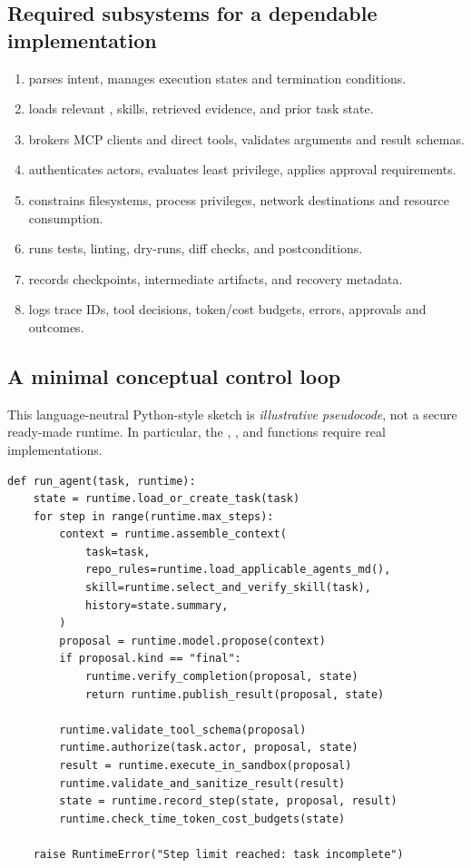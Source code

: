 \documentclass[11pt,letterpaper]{article}
\begin{document}
\subsection{Required subsystems for a dependable implementation}
\begin{enumerate}
\item {} parses intent, manages execution states and termination conditions.
\item {} loads relevant , skills, retrieved evidence, and prior task state.
\item {} brokers MCP clients and direct tools, validates arguments and result schemas.
\item {} authenticates actors, evaluates least privilege, applies approval requirements.
\item {} constrains filesystems, process privileges, network destinations and resource consumption.
\item {} runs tests, linting, dry-runs, diff checks, and postconditions.
\item {} records checkpoints, intermediate artifacts, and recovery metadata.
\item {} logs trace IDs, tool decisions, token/cost budgets, errors, approvals and outcomes.
\end{enumerate}

\subsection{A minimal conceptual control loop}
This language-neutral Python-style sketch is \emph{illustrative pseudocode}, not a secure ready-made runtime. In particular, the , , and  functions require real implementations.
\par\smallskip{}\par
\begin{verbatim}
def run_agent(task, runtime):
    state = runtime.load_or_create_task(task)
    for step in range(runtime.max_steps):
        context = runtime.assemble_context(
            task=task,
            repo_rules=runtime.load_applicable_agents_md(),
            skill=runtime.select_and_verify_skill(task),
            history=state.summary,
        )
        proposal = runtime.model.propose(context)
        if proposal.kind == "final":
            runtime.verify_completion(proposal, state)
            return runtime.publish_result(proposal, state)

        runtime.validate_tool_schema(proposal)
        runtime.authorize(task.actor, proposal, state)
        result = runtime.execute_in_sandbox(proposal)
        runtime.validate_and_sanitize_result(result)
        state = runtime.record_step(state, proposal, result)
        runtime.check_time_token_cost_budgets(state)

    raise RuntimeError("Step limit reached: task incomplete")
\end{verbatim}
\end{document}
